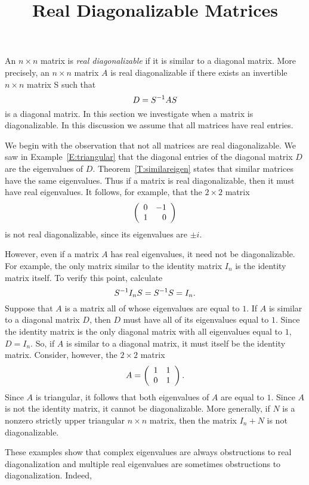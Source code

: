 \documentclass{ximera}
\title{Real Diagonalizable Matrices}
\begin{document}
\begin{abstract}
\end{abstract}
\maketitle

 
\label{S:RDM}

An $n\times n$ matrix is {\em real diagonalizable\/}
 if it is similar  to a
diagonal matrix.  More precisely, 
an $n\times n$ matrix $A$ is
real diagonalizable if there exists an invertible $n\times n$
matrix S such that
\[
D=S^{-1} AS
\]
is a diagonal matrix.  In this section we investigate when a
matrix is diagonalizable.  In this discussion we assume that all
matrices have real entries.

We begin with the observation that not all matrices are real
diagonalizable.  We saw in Example~\ref{E:triangular} that the
diagonal entries of the diagonal matrix $D$ are the eigenvalues
of $D$. Theorem~\ref{T:similareigen} states that similar
matrices have the same eigenvalues.  Thus if a matrix is real
diagonalizable, then it must have real eigenvalues.  It follows,
for example, that the $2\times 2$ matrix 
\[
\left(\begin{array}{rr} 0 & -1\\ 1 &0\end{array}\right)
\]
is not real diagonalizable, since its eigenvalues are $\pm i$. 

However, even if a matrix $A$ has real eigenvalues, it need not
be diagonalizable.  For example, the only matrix similar to the
identity matrix $I_n$ is the identity matrix itself.  To verify
this point, calculate
\[
S^{-1} I_n S = S^{-1} S = I_n.
\]
Suppose that $A$ is a matrix all of whose eigenvalues are equal
to $1$.  If $A$ is similar to a diagonal matrix $D$, then $D$
must have all of its eigenvalues equal to $1$.  Since the
identity matrix is the only diagonal matrix with all eigenvalues
equal to $1$, $D=I_n$.  So, if $A$ is similar to a diagonal
matrix, it must itself be the identity matrix.  Consider,
however, the $2\times 2$ matrix
\[
A=\left(\begin{array}{rr} 1 & 1\\ 0 &1\end{array}\right).
\]
Since $A$ is triangular, it follows that both eigenvalues of $A$
are equal to $1$.  Since $A$ is not the identity matrix, it
cannot be diagonalizable. More generally, if $N$ is a nonzero
strictly upper triangular $n\times n$ matrix, then the matrix
$I_n+N$ is not diagonalizable.  

These examples show that complex eigenvalues are always
obstructions to real diagonalization and multiple real eigenvalues
are sometimes obstructions to diagonalization.  Indeed, 
\end{document}
